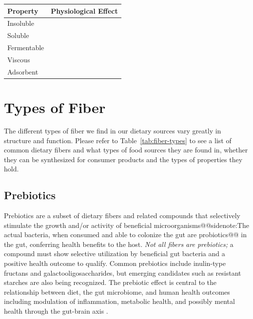 \documentclass{tufte-handout}
\makeatletter
\def\sidenote#1{@@sidenote:#1@@}
\makeatother
\begin{document}
\begin{margintable}
\caption{Properties of fiber and their physiological effects}\label{tab:fiber-effects}
\begin{tabular}{ll}
\hline
\textbf{Property} & \textbf{Physiological Effect} \\ \hline
Insoluble &  \\
Soluble &  \\
Fermentable &  \\
Viscous &  \\
Adsorbent &  \\ \bottomrule
\end{tabular}
\end{margintable}

\section{Types of Fiber}
The different types of fiber we find in our dietary sources vary greatly in structure and function. Please refer to Table~\ref{tab:fiber-types} to see a list of common dietary fibers and what types of food sources they are found in, whether they can be synthesized for consumer products and the types of properties they hold.

\subsection{Prebiotics}
Prebiotics are a subset of dietary fibers and related compounds that selectively stimulate the growth and/or activity of beneficial microorganisms\sidenote{The actual bacteria, when consumed and able to colonize the gut are probiotics} in the gut, conferring health benefits to the host. \emph{Not all fibers are prebiotics;} a compound must show selective utilization by beneficial gut bacteria and a positive health outcome to qualify. Common prebiotics include inulin-type fructans and galactooligosaccharides, but emerging candidates such as resistant starches are also being recognized. The prebiotic effect is central to the relationship between diet, the gut microbiome, and human health outcomes including modulation of inflammation, metabolic health, and possibly mental health through the gut-brain axis \citep{gibsonExpertConsensusDocument2017}.
\end{document}
